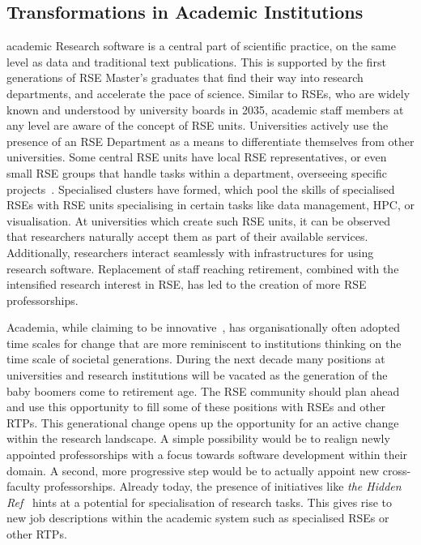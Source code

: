 \documentclass{eceasst}
\begin{document}
\subsection{Transformations in Academic Institutions}
\begin{whatis}{}{academic}
Research software is a central part of scientific practice, on the same level as data and traditional text publications.
This is supported by the first generations of RSE Master's graduates that find their way into research departments, and accelerate the pace of science.
Similar to RSEs, who are widely known and understood by university boards in 2035, academic staff members at any level are aware of the concept of RSE units.
Universities actively use the presence of an RSE Department as a means to differentiate themselves from other universities.
Some central RSE units have local RSE representatives, or even small RSE groups that handle tasks within a department, overseeing specific projects~\cite{Kempf2025-draft}.
Specialised clusters have formed, which pool the skills of specialised RSEs with RSE units specialising in certain tasks like data management, HPC, or visualisation.
At universities which create such RSE units, it can be observed that researchers naturally accept them as part of their available services.
Additionally, researchers interact seamlessly with infrastructures for using research software.
Replacement of staff reaching retirement, combined with the intensified research interest in RSE, has led to the creation of more RSE professorships.
\end{whatis}
Academia, while claiming to be innovative~\cite{wzvgbayern},
has organisationally often adopted time scales for change that are more reminiscent
to institutions thinking on the time scale of societal generations.
During the next decade many positions at universities and research institutions will be vacated as the generation of the baby boomers come to retirement age.
The RSE community should plan ahead and use this opportunity to fill some of these positions with RSEs and other RTPs.
This generational change opens up the opportunity for an active change within the research landscape.
A simple possibility would be to realign newly appointed professorships with a focus towards software development within their domain.
A second, more progressive step would be to actually appoint new cross-faculty professorships.
Already today, the presence of initiatives like \emph{the Hidden Ref}~\cite{hiddenref} hints at a potential for specialisation of research tasks.
This gives rise to new job descriptions within the academic system such as specialised RSEs or other RTPs.
\end{document}
